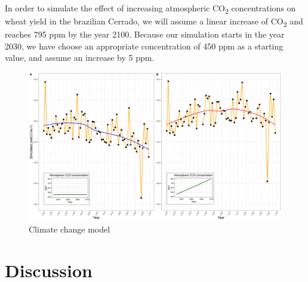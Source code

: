 \documentclass[11pt]{article}
\begin{document}
In order to simulate the effect of increasing atmospheric CO\textsubscript{2} concentrations on wheat yield in the brazilian Cerrado, we will assume a linear increase of CO\textsubscript{2} and reaches 795 ppm by the year 2100. Because our simulation starts in the year 2030, we have choose an appropriate concentration of 450 ppm as a starting value, and assume an increase by 5 ppm.

\begin{figure}[htbp]
\centering
\includegraphics[width=1\textwidth]{../results/cc-model/2023-02-21_yield_prediction_cc_model_CO2_with_conc.png}
\caption{Climate change model}
\end{figure}
\section{Discussion}
\label{sec:orgbfdedb7}
\end{document}
